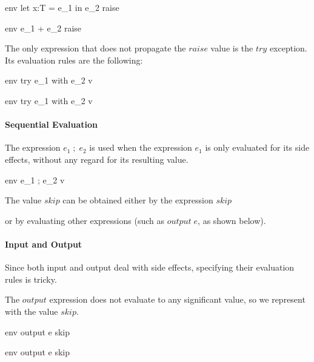 \documentclass{article}
\begin{document}
	{\mbox{env} \vdash let \; x:T = e_1 \; in \; e_2 \Downarrow raise}

	{\mbox{env} \vdash e_1 + e_2 \Downarrow raise}

The only expression that does not propagate the $raise$ value is the $try$ exception.
Its evaluation rules are the following:

	{\mbox{env} \vdash try \; e_1 \; with \; e_2 \Downarrow v}
	
	{\mbox{env} \vdash try \; e_1 \; with \; e_2 \Downarrow v}

\paragraph{Sequential Evaluation}
The expression $e_1 \; ; \; e_2$ is used when the expression $e_1$ is only evaluated for its side effects, without any regard for its resulting value.

	{\mbox{env} \vdash e_1 \; ; \; e_2 \Downarrow v}
	
The value $skip$ can be obtained either by the expression $skip$

	
or by evaluating other expressions (such as $output \; e$, as shown below).

\paragraph{Input and Output}
Since both input and output deal with side effects, specifying their evaluation rules is tricky.

The $output$ expression does not evaluate to any significant value, so we represent with the value $skip$.

	{\mbox{env} \vdash output \; e \Downarrow skip}
	
	{\mbox{env} \vdash output \; e \Downarrow skip}
\end{document}
